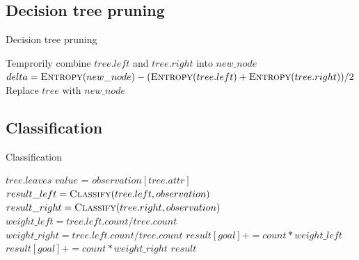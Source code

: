\documentclass{article}
\begin{document}
\subsection{Decision tree pruning}

\begin{algorithm}
\centering
\caption{Decision tree pruning}
\label{alg:prune}
  \begin{algorithmic}[1]
    		\State{}
    	\EndIf
    		\State{}
    	\EndIf
    		\State Temprorily combine $tree.left$ and $tree.right$ into $new\_node$
    		\State $delta = \Call{Entropy}{new\_node}-  (\Call{Entropy}{tree.left} + \Call{Entropy}{tree.right}) / 2$
    			\State Replace $tree$ with $new\_node$
    		\EndIf
    	\EndIf
    \EndFunction
  \end{algorithmic}
\end{algorithm}

\subsection{Classification}

\begin{algorithm}
\centering
\caption{Classification}
\label{alg:cla}
  \begin{algorithmic}[1]
    		\State\Return $tree.leaves$
    	\EndIf
    	\State $value$ = $observation[tree.attr]$
    		\State $result\_left =  \Call{Classify}{tree.left, observation}$
    		\State $result\_right =  \Call{Classify}{tree.right, observation}$
    		\State $weight\_left = tree.left.count/tree.count$
    		\State $weight\_right = tree.left.count/tree.count$
    			\State$result[goal] += count * weight\_left$
    		\EndFor
    			\State$result[goal] += count * weight\_right$
    		\EndFor
    		\State \Return $result$
    	\Else
    			\State \Return {}
    		\Else
    			\State \Return {}
    		\EndIf
    	\EndIf
    \EndFunction
  \end{algorithmic}
\end{algorithm}
\end{document}
